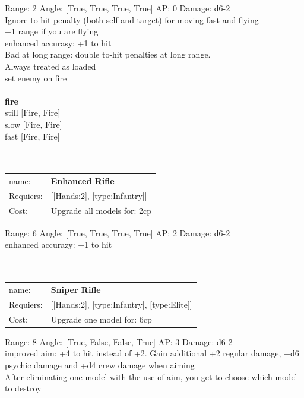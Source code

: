 Range: 2  Angle: [True, True, True, True] AP: 0 Damage: d6-2 \\
Ignore to-hit penalty (both self and target) for moving fast and flying\\ 
+1 range if you are flying\\ 
enhanced accurasy: +1 to hit\\ 
Bad at long range: double to-hit penalties at long range.\\ 
Always treated as loaded\\ 
set enemy on fire\\ 







\ \\ {\bf fire } \\
still [Fire, Fire] \\
slow [Fire, Fire] \\
fast [Fire, Fire] \\

\ \\
\ \\
\begin{tabular}{ll}
name: & {\bf Enhanced Rifle } \\
Requiers: & [[Hands:2], [type:Infantry]] \\
Cost: & Upgrade all models for: 2cp \\
\end{tabular}



Range: 6  Angle: [True, True, True, True] AP: 2 Damage: d6-2 \\
enhanced accurazy: +1 to hit\\ 








\ \\
\ \\
\begin{tabular}{ll}
name: & {\bf Sniper Rifle } \\
Requiers: & [[Hands:2], [type:Infantry], [type:Elite]] \\
Cost: & Upgrade one model for: 6cp \\
\end{tabular}



Range: 8  Angle: [True, False, False, True] AP: 3 Damage: d6-2 \\
improved aim: +4 to hit instead of +2. Gain additional +2 regular damage, +d6 psychic damage and +d4 crew damage when aiming\\ 
After eliminating one model with the use of aim, you get to choose which model to destroy\\ 








